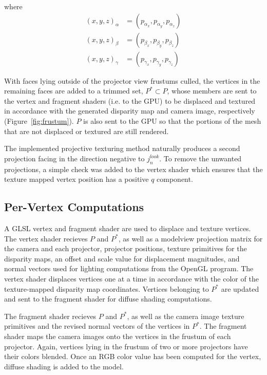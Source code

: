 \documentclass[a4paper,twoside]{article}
\begin{document}
where
\begin{align}
\nonumber
(x, y, z)_{\alpha} &= (p_{\alpha_{x}}, p_{\alpha_{y}}, p_{\alpha_{z}})\\
\nonumber
(x, y, z)_{\beta} &= (p_{\beta_{x}}, p_{\beta_{y}}, p_{\beta_{z}})\\
(x, y, z)_{\gamma} &= (p_{\gamma_{x}}, p_{\gamma_{y}}, p_{\gamma_{z}})
\end{align}


With faces lying outside of the projector view frustums culled, the vertices in the remaining faces are added to a trimmed set, $P^{*}\subset P$, whose members are sent to the vertex and fragment shaders (i.e. to the GPU) to be displaced and textured in accordance with the generated disparity map and camera image, respectively (Figure~\ref{fig:frustum}). $P$ is also sent to the GPU so that the portions of the mesh that are not displaced or textured are still rendered.

The implemented projective texturing method naturally produces a second projection facing in the direction negative to $j_{n}^{look}$. To remove the unwanted projections, a simple check was added to the vertex shader which ensures that the texture mapped vertex position has a positive $q$ component.

\subsection{Per-Vertex Computations}

A GLSL vertex and fragment shader are used to displace and texture vertices. The vertex shader recieves $P$ and $P^{*}$, as well as a modelview projection matrix for the camera and each projector, projector positions, texture primitives for the disparity maps, an offset and scale value for displacement magnitudes, and normal vectors used for lighting computations from the OpenGL program. The vertex shader displaces vertices one at a time in accordance with the color of the texture-mapped disparity map coordinates. Vertices belonging to $P^{*}$ are updated and sent to the fragment shader for diffuse shading computations.

The fragment shader recieves $P$ and $P^{*}$, as well as the camera image texture primitives and the revised normal vectors of the vertices in $P^{*}$. The fragment shader maps the camera images onto the vertices in the frustum of each projector. Again, vertices lying in the frustum of two or more projectors have their colors blended. Once an RGB color value has been computed for the vertex, diffuse shading is added to the model.
\end{document}
